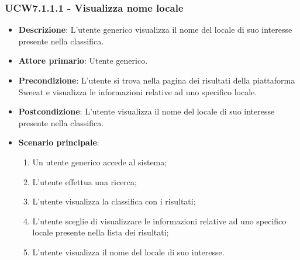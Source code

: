\subsubsection{UCW7.1.1.1 - Visualizza nome locale}
\begin{itemize}
	\item \textbf{Descrizione}: L'utente generico visualizza il nome del locale di suo interesse presente nella classifica.
    \item \textbf{Attore primario}: Utente generico.
    \item \textbf{Precondizione}: L’utente si trova nella pagina dei risultati della piattaforma Sweeat e visualizza le informazioni relative ad uno specifico locale.
    \item \textbf{Postcondizione}: L’utente visualizza il nome del locale di suo interesse presente nella classifica.
    \item \textbf{Scenario principale}: 
    \begin{enumerate}
        \item Un utente generico accede al sistema;
        \item L’utente effettua una ricerca;
        \item L'utente visualizza la classifica con i risultati;
        \item L'utente sceglie di visualizzare le informazioni relative ad uno specifico locale presente nella lista dei risultati;
        \item L'utente visualizza il nome del locale di suo interesse.
    \end{enumerate}
\end{itemize}

